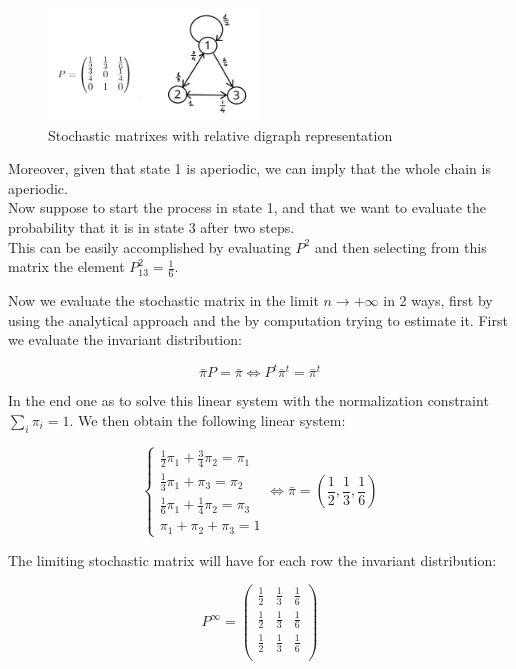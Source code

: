 \begin{figure}[H]
    \centering
    \includegraphics[width=0.5\textwidth]{FIG/exercise_4_images/Exercise 4_part2.png}
    \caption{Stochastic matrixes with relative digraph representation}
    \label{chapter4:part2}
\end{figure}

Moreover, given that state 1 is aperiodic, we can imply that the whole chain is aperiodic. \\

Now suppose to start the process in state 1, and that we want to evaluate the probability that it is in state 3 after two steps. \\
This can be easily accomplished by evaluating $P^2$ and then selecting from this matrix the element $P^2_{13} = \frac{1}{6}$.

Now we evaluate the stochastic matrix in the limit $n \to +\infty$ in 2 ways, first by using the analytical approach and the by computation trying to estimate it.
First we evaluate the invariant distribution:

$$ \bar{\pi}P = \bar{\pi} \iff P^t\bar{\pi}^t = \bar{\pi}^t $$

In the end one as to solve this linear system with the normalization constraint $\sum_i\pi_i=1$.
We then obtain the following linear system:

$$
\begin{cases}
\frac{1}{2}\pi_1 + \frac{3}{4}\pi_2 = \pi_1 \\
\frac{1}{3}\pi_1 + \pi_3 = \pi_2 \\
\frac{1}{6}\pi_1 + \frac{1}{4}\pi_2 = \pi_3 \\
\pi_1 + \pi_2 + \pi_3 = 1
\end{cases} \iff \bar{\pi} = \left( \frac{1}{2}, \frac{1}{3}, \frac{1}{6} \right)
$$

The limiting stochastic matrix will have for each row the invariant distribution:

$$ P^{\infty} =
\begin{pmatrix} 
\frac{1}{2} & \frac{1}{3} & \frac{1}{6} \\
\frac{1}{2} & \frac{1}{3} & \frac{1}{6} \\
\frac{1}{2} & \frac{1}{3} & \frac{1}{6} \\
\end{pmatrix}
$$

